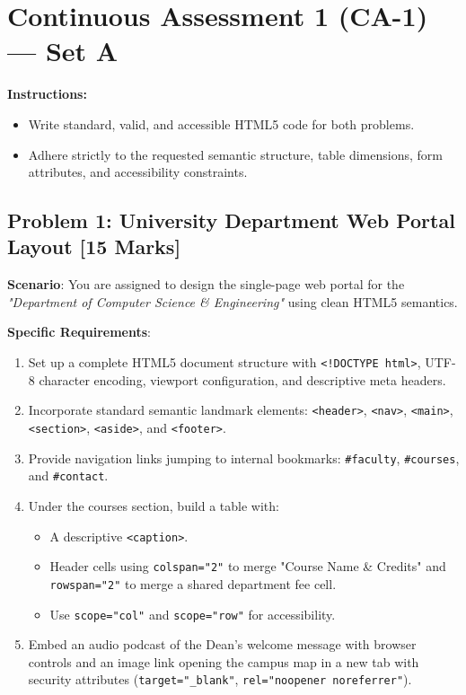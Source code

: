 \section{Continuous Assessment 1 (CA-1) --- Set A}

\vspace{3mm}
\noindent\textbf{Instructions:}
\begin{itemize}[itemsep=1mm]
  \item Write standard, valid, and accessible HTML5 code for both problems.
  \item Adhere strictly to the requested semantic structure, table dimensions, form attributes, and accessibility constraints.
\end{itemize}

\vspace{4mm}
\subsection*{Problem 1: University Department Web Portal Layout [15 Marks]}
\noindent
\textbf{Scenario}: You are assigned to design the single-page web portal for the \textit{"Department of Computer Science \& Engineering"} using clean HTML5 semantics.

\noindent\textbf{Specific Requirements}:
\begin{enumerate}[label=(\alph*), leftmargin=8mm]
  \item Set up a complete HTML5 document structure with \texttt{<!DOCTYPE html>}, UTF-8 character encoding, viewport configuration, and descriptive meta headers.
  \item Incorporate standard semantic landmark elements: \texttt{<header>}, \texttt{<nav>}, \texttt{<main>}, \texttt{<section>}, \texttt{<aside>}, and \texttt{<footer>}.
  \item Provide navigation links jumping to internal bookmarks: \texttt{\#faculty}, \texttt{\#courses}, and \texttt{\#contact}.
  \item Under the courses section, build a table with:
    \begin{itemize}
      \item A descriptive \texttt{<caption>}.
      \item Header cells using \texttt{colspan="2"} to merge "Course Name \& Credits" and \texttt{rowspan="2"} to merge a shared department fee cell.
      \item Use \texttt{scope="col"} and \texttt{scope="row"} for accessibility.
    \end{itemize}
  \item Embed an audio podcast of the Dean's welcome message with browser controls and an image link opening the campus map in a new tab with security attributes (\texttt{target="\_blank"}, \texttt{rel="noopener noreferrer"}).
\end{enumerate}

